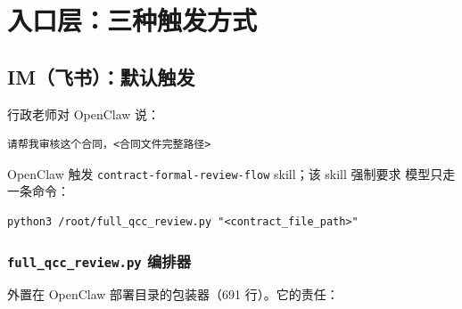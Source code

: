 \documentclass[11pt,a4paper]{article}
\begin{document}
\section{入口层：三种触发方式}

\subsection{IM（飞书）：默认触发}

行政老师对 OpenClaw 说：

\begin{lstlisting}[style=shell]
请帮我审核这个合同，<合同文件完整路径>
\end{lstlisting}

OpenClaw 触发 \texttt{contract-formal-review-flow} skill；该 skill 强制要求
模型只走一条命令：

\begin{lstlisting}[style=shell]
python3 /root/full_qcc_review.py "<contract_file_path>"
\end{lstlisting}

\subsubsection{\texttt{full\_qcc\_review.py} 编排器}

外置在 OpenClaw 部署目录的包装器（691 行）。它的责任：
\end{document}
